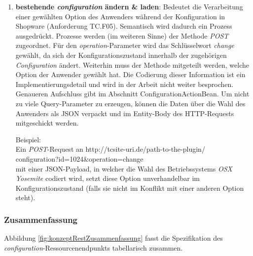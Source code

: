 \documentclass[11pt, a4paper, titlepage, listof=totoc, bibliography=totoc, index=totoc, twoside, openright, headings=normal]{scrreprt}
\begin{document}
\begin{enumerate}
\begin{addmargin}[25pt]{0pt}
Beispiel:\\
Ein \emph{POST}-Request an \glqq http://tcsite-uri.de/path-to-the-plugin/
\\configuration?id=1024\&operation=copy\grqq{}
\\kopiert die \emph{Quotation} mit der ID 1024.
\end{addmargin}
\item \textbf{bestehende \emph{configuration} ändern \& laden}: Bedeutet die Verarbeitung einer gewählten Option des Anwenders während der Konfiguration in Shopware (Anforderung TC.F05). Semantisch wird dadurch ein Prozess ausgedrückt. Prozesse werden (im weiteren Sinne) der Methode \emph{POST} zugeordnet. Für den \emph{operation}-Parameter wird das Schlüsselwort \emph{change} gewählt, da sich der Konfigurationszustand innerhalb der zugehörigen \emph{Configuration} ändert. Weiterhin muss der Methode mitgeteilt werden, welche Option der Anwender gewählt hat. Die Codierung dieser Information ist ein Implementierungsdetail und wird in der Arbeit nicht weiter besprochen. Genaueren Aufschluss gibt \citet{tactonTCsiteDevelopmentManual} im Abschnitt \glqq ConfigurationActionBean\grqq{}. Um nicht zu viele Query-Parameter zu erzeugen, können die Daten über die Wahl des Anwenders als JSON verpackt und im Entity-Body des HTTP-Requests mitgeschickt werden.
\begin{addmargin}[25pt]{0pt} 
Beispiel:\\
Ein \emph{POST}-Request an \glqq http://tcsite-uri.de/path-to-the-plugin/
\\configuration?id=1024\&operation=change\grqq{}
\\mit einer JSON-Payload, in welcher die Wahl des Betriebssystems \emph{OSX Yosemite} codiert wird, setzt diese Option unverhandelbar im Konfigurationszustand (falls sie nicht im Konflikt mit einer anderen Option steht).
\end{addmargin}
\end{enumerate}

\subsubsection{Zusammenfassung}
Abbildung \ref{fig:konzeptRestZusammenfassung} fasst die Spezifikation des  \emph{configuration}-Ressourcenendpunkts tabellarisch zusammen.
\end{document}
